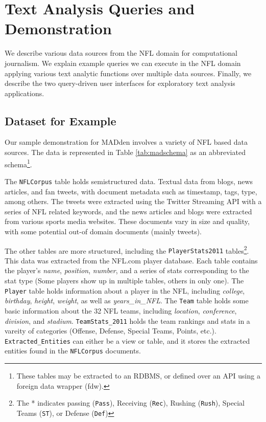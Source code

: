 \section{Text Analysis Queries and Demonstration}

We describe various data sources from the NFL domain for computational
journalism. 
We explain example queries we can execute in the NFL domain applying
various text analytic functions over multiple data sources. 
Finally, we describe the two query-driven user interfaces for 
exploratory text analysis applications.


\subsection{Dataset for Example}
Our sample demonstration for MADden involves a variety of NFL based data sources. 
The data is represented in Table \ref{tab:madschema} as an abbreviated
schema\footnote{These tables may be extracted to an RDBMS, or defined over an
API using a foreign data wrapper (fdw).}.

The {\tt NFLCorpus} table holds semistructured data. Textual data from blogs,
news articles, and fan tweets, with document metadata such as timestamp, tags,
type, among others. The tweets were extracted using the Twitter Streaming API
with a series of NFL related keywords, and the news articles and blogs were
extracted from various sports media websites. These documents vary in size and
quality, with some potential out-of domain documents (mainly tweets).

The other tables are more structured,
including the {\tt PlayerStats2011} tables\footnote{The * indicates passing ({\tt Pass}),
Receiving ({\tt Rec}), Rushing ({\tt Rush}), Special Teams ({\tt ST}), or
Defense ({\tt Def})\label{fn:playerstats}}.
This data was extracted from the NFL.com player database. Each table contains
the player's \textit{name}, \textit{position}, \textit{number}, and a series of
stats corresponding to the stat type (Some players show up in multiple tables, others in only one). The
{\tt Player} table holds information about a player in the NFL, including
\textit{college}, \textit{birthday}, \textit{height}, \textit{weight}, as well
as \textit{years\_in\_NFL}. The {\tt Team} table holds some basic information
about the 32 NFL teams, including \textit{location}, \textit{conference}, \textit{division}, and \textit{stadium}.
{\tt TeamStats\_2011} holds the team rankings and stats in a vareity of categories (Offense, Defense, Special Teams,
Points, etc.).
{\tt Extracted\_Entities} can either be a view or table, and it stores the
extracted entities found in the {\tt NFLCorpus} documents.




